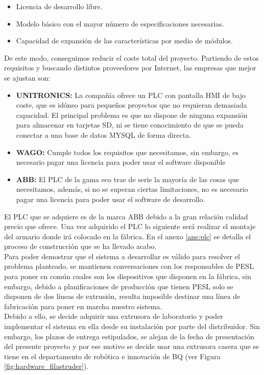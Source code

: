\begin{itemize}
		\item{Licencia de desarrollo libre.}
		\item{Modelo básico con el mayor número de especificaciones necesarias.}
		\item{Capacidad de expansión de las características por medio de módulos.}
\end{itemize}

De este modo, conseguimos reducir el coste total del proyecto. Partiendo de estos requisitos y buscando distintos proveedores por Internet, las empresas que mejor se ajustan son:

\begin{itemize}
		\item{\textbf{UNITRONICS:} La compañía ofrece un PLC con pantalla HMI de bajo coste, que es idóneo para pequeños proyectos que no requieran demasiada capacidad. El principal problema es que no dispone de ninguna expansión para almacenar en tarjetas SD, ni se tiene conocimiento de que se pueda conectar a una base de datos MYSQL de forma directa.}
		\item{\textbf{WAGO:} Cumple todos los requisitos que necesitamos, sin embargo, es necesario pagar una licencia para poder usar el software disponible}
		\item{\textbf{ABB:} El PLC de la gama eco trae de serie la mayoría de las cosas que necesitamos, además, si no se superan ciertas limitaciones, no es necesario pagar una licencia para poder usar el software de desarrollo.}
\end{itemize}

El PLC que se adquiere es de la marca ABB debido a la gran relación calidad precio que ofrece. Una vez adquirido el PLC lo siguiente será realizar el montaje del armario donde irá colocado en la fábrica. En el anexo \ref{ane:plc} se detalla el proceso de construcción que se ha llevado acabo.\\

Para poder demostrar que el sistema a desarrollar es válido para resolver el problema planteado, se mantienen conversaciones con los responsables de PESL para poner en común cuales son los dispositivos que disponen en la fábrica, sin embargo, debido a planificaciones de producción que tienen PESL solo se disponen de dos líneas de extrusión, resulta imposible destinar una línea de fabricación para poner en marcha nuestro sistema.\\

Debido a ello, se decide adquirir una extrusora de laboratorio y poder implementar el sistema en ella desde su instalación por parte del distribuidor. Sin embargo, los plazos de entrega estipulados, se alejan de la fecha de presentación del presente proyecto y por ese motivo se decide usar una extrusora casera que se tiene en el departamento de robótica e innovación de BQ (ver Figura \ref{fig:hardware_filastruder}).

